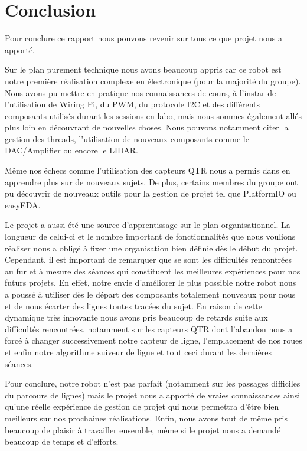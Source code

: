 
\chapter{Conclusion}

Pour conclure ce rapport nous pouvons revenir sur tous ce que projet nous a apporté.

Sur le plan purement technique nous avons beaucoup appris car ce robot est notre première réalisation complexe en électronique (pour la majorité du groupe). Nous avons pu mettre en pratique nos connaissances de cours, à l'instar de l'utilisation de Wiring Pi, du PWM, du protocole I2C et des différents composants utilisés durant les sessions en labo, mais nous sommes également allés plus loin en découvrant de nouvelles choses. Nous pouvons notamment citer la gestion des threads, l'utilisation de nouveaux composants comme le DAC/Amplifier ou encore le LIDAR.

Même nos échecs comme l'utilisation des capteurs QTR nous a permis dans en apprendre plus sur de nouveaux sujets. De plus, certains membres du groupe ont pu découvrir de nouveaux outils pour la gestion de projet tel que PlatformIO ou easyEDA.

Le projet a aussi été une source d'apprentissage sur le plan organisationnel. La longueur de celui-ci et le nombre important de fonctionnalités que nous voulions réaliser nous a obligé à fixer une organisation bien définie dès le début du projet. Cependant, il est important de remarquer que se sont les difficultés rencontrées au fur et à mesure des séances qui constituent les meilleures expériences pour nos futurs projets. En effet, notre envie d'améliorer le plus possible notre robot nous a poussé à utiliser dès le départ des composants totalement nouveaux pour nous et de nous écarter des lignes toutes tracées du sujet. En raison de cette dynamique très innovante nous avons pris beaucoup de retards suite aux difficultés rencontrées, notamment sur les capteurs QTR dont l'abandon nous a forcé à changer successivement notre capteur de ligne, l'emplacement de nos roues et enfin notre algorithme suiveur de ligne et tout ceci durant les dernières séances.

Pour conclure, notre robot n'est pas parfait (notamment sur les passages difficiles du parcours de lignes) mais le projet nous a apporté de vraies connaissances ainsi qu'une réelle expérience de gestion de projet qui nous permettra d'être bien meilleurs sur nos prochaines réalisations. Enfin, nous avons tout de même pris beaucoup de plaisir à travailler ensemble, même si le projet nous a demandé beaucoup de temps et d'efforts.